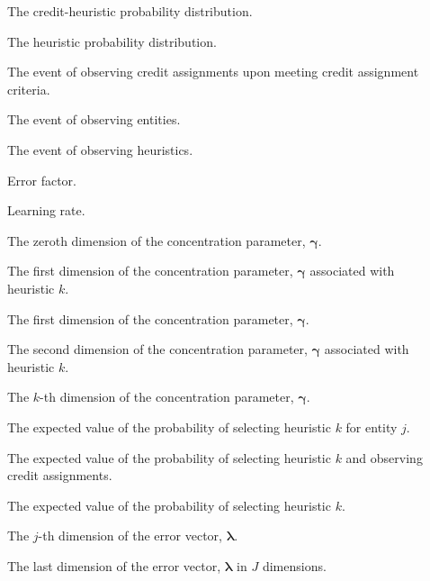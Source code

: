 \begin{description}
	\item [\parbox{2cm}{$\boldsymbol{\psi}$}] \parbox{12.5cm}{The credit-heuristic probability distribution.}
	\item [\parbox{2cm}{$\boldsymbol{\theta}$}] \parbox{12.5cm}{The heuristic probability distribution.}
	\item [\parbox{2cm}{$\boldsymbol{C}$}] \parbox{12.5cm}{The event of observing credit assignments upon meeting credit assignment criteria.}
	\item [\parbox{2cm}{$\boldsymbol{E}$}] \parbox{12.5cm}{The event of observing entities.}
	\item [\parbox{2cm}{$\boldsymbol{H}$}] \parbox{12.5cm}{The event of observing heuristics.}
	\item [\parbox{2cm}{$\epsilon$}] \parbox{12.5cm}{Error factor.}
	\item [\parbox{2cm}{$\eta$}] \parbox{12.5cm}{Learning rate.}
	\item [\parbox{2cm}{$\gamma_{0}$}] \parbox{12.5cm}{The zeroth dimension of the concentration parameter, $\boldsymbol{\gamma}$.}
	\item [\parbox{2cm}{$\gamma_{1,k}$}] \parbox{12.5cm}{The first dimension of the concentration parameter, $\boldsymbol{\gamma}$ associated with heuristic $k$.}
	\item [\parbox{2cm}{$\gamma_{1}$}] \parbox{12.5cm}{The first dimension of the concentration parameter, $\boldsymbol{\gamma}$.}
	\item [\parbox{2cm}{$\gamma_{2,k}$}] \parbox{12.5cm}{The second dimension of the concentration parameter, $\boldsymbol{\gamma}$ associated with heuristic $k$.}
	\item [\parbox{2cm}{$\gamma_{K}$}] \parbox{12.5cm}{The $k$-th dimension of the concentration parameter, $\boldsymbol{\gamma}$.}
	\item [\parbox{2cm}{$\hat{\phi}_{j,k}$}] \parbox{12.5cm}{The expected value of the probability of selecting heuristic $k$ for entity $j$.}
	\item [\parbox{2cm}{$\hat{\psi}_{k}$}] \parbox{12.5cm}{The expected value of the probability of selecting heuristic $k$ and observing credit assignments.}
	\item [\parbox{2cm}{$\hat{\theta}_{k}$}] \parbox{12.5cm}{The expected value of the probability of selecting heuristic $k$.}
	\item [\parbox{2cm}{$\lambda_{j}$}] \parbox{12.5cm}{The $j$-th dimension of the error vector, $\boldsymbol{\lambda}$.}
	\item [\parbox{2cm}{$\lambda_{J}$}] \parbox{12.5cm}{The last dimension of the error vector, $\boldsymbol{\lambda}$ in $J$ dimensions.}

\end{description}
